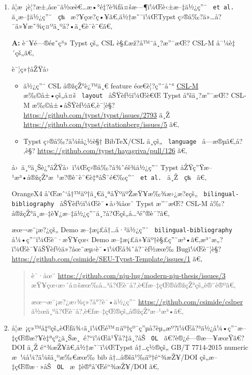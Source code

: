 \begin{enumerate}
\item
  å­¦æ~¡è¦?æ±‚åœ¨ä½œè€\ldots æ•°é‡?è¾ƒå¤šæ---¶ï¼Œè‹±æ--‡ä½¿ç''¨
  \texttt{\ et\ al.\ } ä¸­æ--‡ä½¿ç''¨ \texttt{\ ç­‰\ }
  æ?¥çœ?ç•¥ã€‚ä½†æ˜¯ï¼ŒTypst
  ç›®å‰?ä»\ldots å?¯ä»¥æ˜¾ç¤ºä¸ºå?•ä¸€è¯­è¨€ã€‚

  \textbf{A:} è¯¥é---®é¢˜ç³» Typst çš„ CSL è§£æž?å™¨ä¸?æ''¯æŒ? CSL-M
  å¯¼è‡´çš„ã€‚

  è¯¦ç»†åŽŸå›

  \begin{itemize}
  \tightlist
  \item
    ä½¿ç''¨ CSL å®žçŽ°è¿™ä¸€ feature éœ€è¦?ç''¨åˆ°
    \href{https://citeproc-js.readthedocs.io/en/latest/csl-m/index.html\#cs-layout-extension}{CSL-M}
    æ‰©å±•çš„å¤š \texttt{\ layout\ } åŠŸèƒ½ï¼Œè€Œ Typst å°šä¸?æ''¯æŒ?
    CSL-M æ‰©å±•åŠŸèƒ½ã€‚è¯¦è§?
    \url{https://github.com/typst/typst/issues/2793} ä¸Ž
    \url{https://github.com/typst/citationberg/issues/5} ã€‚
  \item
    Typst ç›®å‰?ä¼šå¿½è§† BibTeX/CSL ä¸­çš„ \texttt{\ language\ }
    å­---æ®µã€‚å?‚è§? \url{https://github.com/typst/hayagriva/pull/126}
    ã€‚
  \end{itemize}

  å›~ä¸ºä¸Šè¿°åŽŸå›~ï¼Œç›®å‰?å¾ˆéš¾ä½¿ç''¨ Typst
  åŽŸç''Ÿæ--¹æ³•å®žçŽ°æ~¹æ?®è¯­è¨€è‡ªåŠ¨é€‰ç''¨ \texttt{\ et\ al.\ } ä¸Ž
  \texttt{\ ç­‰\ } ã€‚

  OrangeX4 å'Œæˆ`å†™äº†ä¸€ä¸ªåŸºäºŽæŸ¥æ‰¾æ›¿æ?¢çš„
  \texttt{\ bilingual-bibliography\ } åŠŸèƒ½ï¼Œè¯•å›¾åœ¨ Typst æ''¯æŒ?
  CSL-M å‰?å®žçŽ°ä¸­æ--‡è¥¿æ--‡ä½¿ç''¨ä¸?å?Œçš„å\ldots³é''®è¯?ã€‚

  æœ¬æ¨¡æ?¿çš„ Demo æ--‡æ¡£å†\ldots å·²ä½¿ç''¨
  \texttt{\ bilingual-bibliography\ } å¼•ç''¨ï¼Œè¯·æŸ¥çœ‹ Demo
  æ--‡æ¡£ä»¥äº†è§£ç''¨æ³•ã€‚æ³¨æ„?ï¼Œè¯¥åŠŸèƒ½ä»?åœ¨æµ‹è¯•ï¼Œå¾ˆå?¯èƒ½æœ‰
  Bugï¼Œè¯¦è§?
  \url{https://github.com/csimide/SEU-Typst-Template/issues/1} ã€‚

  \begin{quote}
  è¯·åœ¨ \url{https://github.com/nju-lug/modern-nju-thesis/issues/3}
  æŸ¥çœ‹æ›´å¤šæœ‰å\ldots³å?Œè¯­å?‚è€ƒæ--‡çŒ®å®žçŽ°çš„è®¨è®ºã€‚

  æœ¬æ¨¡æ?¿æ›¾ç»?å°?è¯•ä½¿ç''¨ \url{https://github.com/csimide/cslper}
  ä½œä¸ºå?Œè¯­å?‚è€ƒæ--‡çŒ®çš„å®žçŽ°æ--¹æ³•ã€‚
  \end{quote}
\item
  å­¦æ~¡ç»™å‡ºçš„èŒƒä¾‹ä¸­ï¼Œé™¤äº†çº¯ç''µå­?èµ„æº?ï¼Œå?³ä½¿å¼•ç''¨æ--‡çŒ®æ?¥è‡ªçº¿ä¸Šæ¸~é?{}``ï¼Œä¹Ÿå?‡ä¸?åŠ
  \texttt{\ OL\ } ã€?è®¿é---®æ---¥æœŸã€?DOI ä¸Ž é``¾æŽ¥ã€‚ä½†æ˜¯ï¼ŒTypst
  å†\ldots ç½®çš„ GB/T 7714-2015 numeric æ~¼å¼?ä¼šä¸ºæ‰€æœ‰ bib
  å†\ldots å®šä¹‰äº†é``¾æŽ¥/DOI çš„æ--‡çŒ®æ·»åŠ \texttt{\ OL\ }
  æ~‡è®°å'Œé``¾æŽ¥/DOI ã€‚


\end{enumerate}
